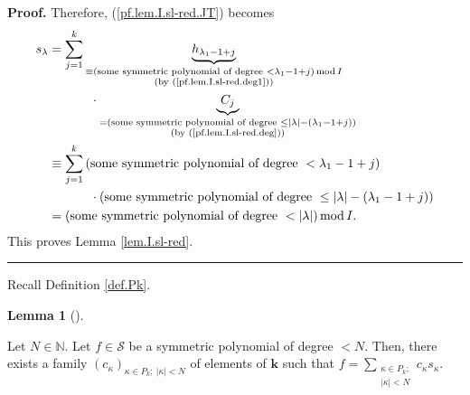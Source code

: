 \documentclass[numbers=enddot,12pt,final,onecolumn,notitlepage]{scrartcl}%
\theoremstyle{definition}
\newtheorem{lem}[theo]{Lemma}
\newenvironment{lemma}[1][]
{\begin{lem}[#1]\begin{leftbar}}
{\end{leftbar}\end{lem}}
\newenvironment{proof}[1][Proof]{\noindent\textbf{#1.} }{\ \rule{0.5em}{0.5em}}
\let\sumnonlimits\sum
\renewcommand{\sum}{\sumnonlimits\limits}
\begin{document}
\begin{proof}
Therefore, (\ref{pf.lem.I.sl-red.JT}) becomes%
\begin{align*}
s_{\lambda}  &  =\sum_{j=1}^{k}\underbrace{h_{\lambda_{1}-1+j}}%
_{\substack{\equiv\left(  \text{some symmetric polynomial of degree }%
<\lambda_{1}-1+j\right)  \operatorname{mod}I\\\text{(by
(\ref{pf.lem.I.sl-red.deg1}))}}}\\
&  \ \ \ \ \ \ \ \ \ \ \cdot\underbrace{C_{j}}_{\substack{=\left(  \text{some
symmetric polynomial of degree }\leq\left\vert \lambda\right\vert -\left(
\lambda_{1}-1+j\right)  \right)  \\\text{(by (\ref{pf.lem.I.sl-red.deg}))}}}\\
&  \equiv\sum_{j=1}^{k}\left(  \text{some symmetric polynomial of degree
}<\lambda_{1}-1+j\right) \\
&  \ \ \ \ \ \ \ \ \ \ \cdot\left(  \text{some symmetric polynomial of degree
}\leq\left\vert \lambda\right\vert -\left(  \lambda_{1}-1+j\right)  \right) \\
&  =\left(  \text{some symmetric polynomial of degree }<\left\vert
\lambda\right\vert \right)  \operatorname{mod}I.
\end{align*}
This proves Lemma \ref{lem.I.sl-red}.
\end{proof}

Recall Definition \ref{def.Pk}.

\begin{lemma}
\label{lem.I.sm-as-smaller}Let $N\in\mathbb{N}$. Let $f\in\mathcal{S}$ be a
symmetric polynomial of degree $<N$. Then, there exists a family $\left(
c_{\kappa}\right)  _{\kappa\in P_{k};\ \left\vert \kappa\right\vert <N}$ of
elements of $\mathbf{k}$ such that $f=\sum_{\substack{\kappa\in P_{k}%
;\\\left\vert \kappa\right\vert <N}}c_{\kappa}s_{\kappa}$.
\end{lemma}
\end{document}
